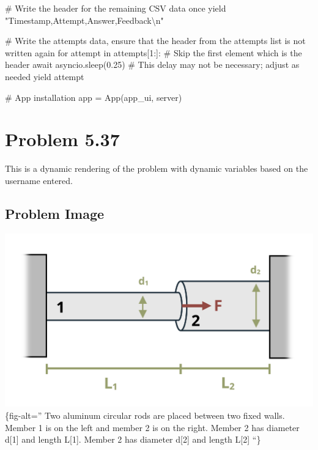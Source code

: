 \documentclass[
  letterpaper,
  DIV=11,
  numbers=noendperiod]{scrreprt}
\newenvironment{Shaded}{\begin{snugshade}}{\end{snugshade}}
\newcommand{\NormalTok}[1]{\textcolor[rgb]{0.00,0.23,0.31}{#1}}
\begin{document}
\begin{Shaded}
\begin{Highlighting}[]
\NormalTok{        \# Write the header for the remaining CSV data once}
\NormalTok{        yield "Timestamp,Attempt,Answer,Feedback\textbackslash{}n"}
        
\NormalTok{        \# Write the attempts data, ensure that the header from the attempts list is not written again}
\NormalTok{        for attempt in attempts[1:]:  \# Skip the first element which is the header}
\NormalTok{            await asyncio.sleep(0.25)  \# This delay may not be necessary; adjust as needed}
\NormalTok{            yield attempt}


\NormalTok{\# App installation}
\NormalTok{app = App(app\_ui, server)}
\end{Highlighting}
\end{Shaded}

\chapter*{Problem 5.37}\label{problem-5.37}


This is a dynamic rendering of the problem with dynamic variables based
on the username entered.

\section*{Problem Image}\label{problem-image-35}


\includegraphics{images/247.png}\{fig-alt='' Two aluminum circular rods
are placed between two fixed walls. Member 1 is on the left and member 2
is on the right. Member 2 has diameter d{[}1{]} and length L{[}1{]}.
Member 2 has diameter d{[}2{]} and length L{[}2{]} ``\}
\end{document}
